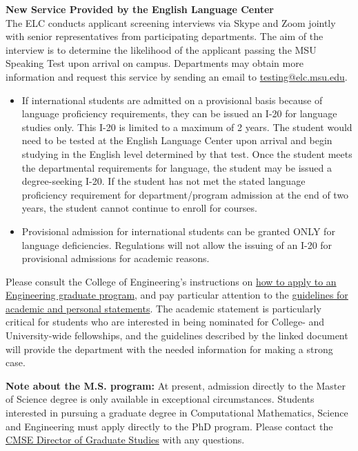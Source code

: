 \noindent
{\large \textbf{New Service Provided by the English Language Center}} 
\\

The ELC conducts applicant screening interviews via Skype and Zoom
jointly with senior representatives from participating departments.
The aim of the interview is to determine the likelihood of the
applicant passing the MSU Speaking Test upon arrival on campus.
Departments may obtain more information and request this service by
sending an email to \href{mailto:testing@elc.msu.edu}{testing@elc.msu.edu}.

\begin{itemize}

\item If international students are admitted on a provisional basis
  because of language proficiency requirements, they can be issued an
  I-20 for language studies only.   This I-20 is limited to a maximum
  of 2 years.  The student would need to be tested at the English
  Language Center upon arrival and begin studying in the English level
  determined by that test.  Once the student meets the departmental
  requirements for language, the student may be issued a
  degree-seeking I-20.   If the student has not met the stated
  language proficiency requirement for department/program admission at
  the end of two years, the student cannot continue to enroll for
  courses. 

\item Provisional admission for international students can be granted
  ONLY for language deficiencies.  Regulations will not allow the
  issuing of an I-20 for provisional admissions for academic reasons.   

\end{itemize}






Please consult the College of Engineering's instructions on
\href{http://www.egr.msu.edu/academics/graduate/how-to-apply}{how to
apply to an Engineering graduate program}, and pay particular
attention to the
\href{http://www.egr.msu.edu/academics/graduate/academic-personal-statements-guidelines/}{guidelines
for academic and personal statements}.  The academic statement is
particularly critical for students who are interested in being
nominated for College- and University-wide fellowships, and the
guidelines described by the linked document will provide the
department with the needed information for making a strong case.

\vspace{3mm}
\noindent \textbf{Note about the M.S. program:} At present, admission
directly to the Master of Science degree is only available in
exceptional circumstances.  Students interested in pursuing a graduate
degree in Computational Mathematics, Science and Engineering must
apply directly to the PhD program.  Please contact the
\href{mailto:cmsegrad@msu.edu}{CMSE Director of Graduate Studies} with
any questions.

